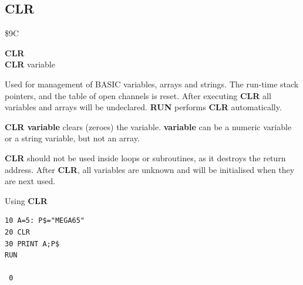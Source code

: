 
\newpage
\subsection{CLR}
\begin{description}[leftmargin=2cm,style=nextline]
\item [Token:] \$9C
\item [Format:] {\bf CLR} \\
                {\bf CLR} variable
\item [Usage:] Used for management of BASIC variables, arrays
               and strings. The run-time stack pointers,
               and the table of open channels is reset.
               After executing {\bf CLR} all variables and arrays will be undeclared.
               {\bf RUN} performs {\bf CLR} automatically.

               {\bf CLR variable} clears (zeroes) the variable.
               {\bf variable} can be a numeric variable or a string variable, but not
               an array.

\item [Remarks:] {\bf CLR} should not be used inside loops or
               subroutines, as it destroys the return address.
               After {\bf CLR}, all variables are unknown and will
               be initialised when they are next used.

\item [Example:] Using {\bf CLR}
\begin{tcolorbox}[colback=black,coltext=white]
\verbatimfont{\codefont}
\begin{verbatim}
10 A=5: P$="MEGA65"
20 CLR
30 PRINT A;P$
RUN

 0
\end{verbatim}
\end{tcolorbox}
\end{description}


\newpage
